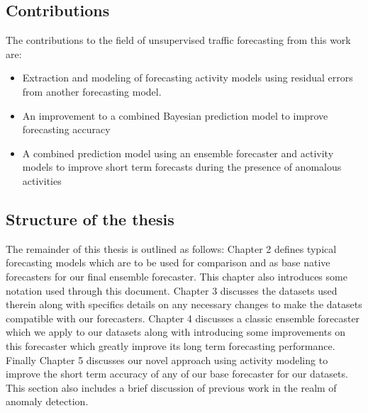 \subsection{Contributions}  
The contributions to the field of unsupervised traffic forecasting from this work are:
\begin{itemize}
\item{Extraction and modeling of forecasting activity models using residual errors from another forecasting model.}
\item{An improvement to a combined Bayesian prediction model to improve forecasting accuracy}
\item{A combined prediction model using an ensemble forecaster and activity models to improve short term forecasts during the presence of anomalous activities}
\end{itemize}

\subsection{Structure of the thesis}
The remainder of this thesis is outlined as follows: Chapter 2 defines typical forecasting models which are to be used for comparison and as base native forecasters for our final ensemble forecaster.  This chapter also introduces some notation used through this document.  Chapter 3 discusses the datasets used therein along with specifics details on any necessary changes to make the datasets compatible with our forecasters.  Chapter 4 discusses a classic ensemble forecaster which we apply to our datasets along with introducing some improvements on this forecaster which greatly improve its long term forecasting performance.  Finally Chapter 5 discusses our novel approach using activity modeling to improve the short term accuracy of any of our base forecaster for our datasets.  This section also includes a brief discussion of previous work in the realm of anomaly detection.